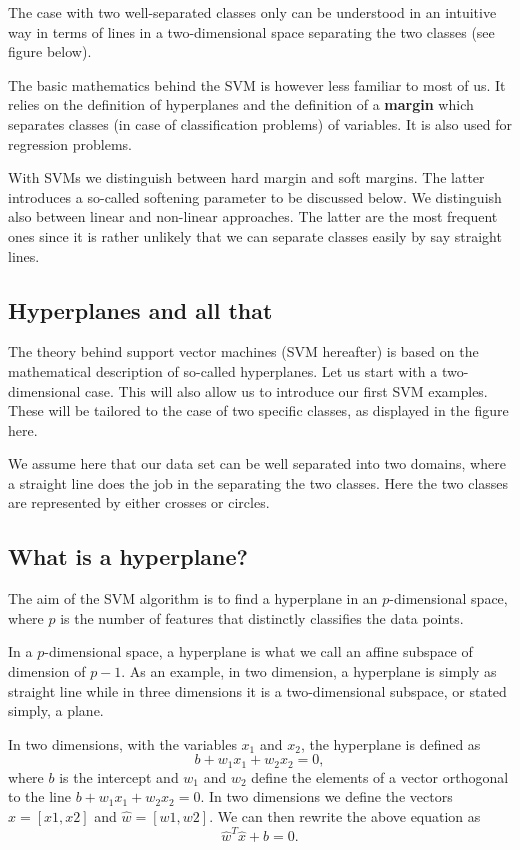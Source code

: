\documentclass[%
oneside,                 %
final,                   %
10pt]{article}
\begin{document}
The case with two well-separated classes only can be understood in an intuitive way in terms of lines in a two-dimensional space separating the two classes (see figure below).  

The basic mathematics behind the SVM is however less familiar to most of us. 
It relies on the definition of hyperplanes and the
definition of a \textbf{margin} which separates classes (in case of
classification problems) of variables. It is also used for regression
problems.

With SVMs we distinguish between hard margin and soft margins. The latter introduces a so-called softening parameter to be discussed below.
We distinguish also between linear and non-linear approaches. The latter are the most frequent ones since it is rather unlikely that we can separate classes easily by say straight lines. 




\subsection*{Hyperplanes and all that}

The theory behind support vector machines (SVM hereafter) is based on
the mathematical description of so-called hyperplanes. Let us start
with a two-dimensional case. This will also allow us to introduce our
first SVM examples. These will be tailored to the case of two specific
classes, as displayed in the figure here.

We assume here that our data set can be well separated into two
domains, where a straight line does the job in the separating the two
classes. Here the two classes are represented by either crosses or
circles.

\subsection*{What is a hyperplane?}

The aim of the SVM algorithm is to find a hyperplane in an $p$-dimensional space, where $p$ is the number of features  that distinctly classifies the data points.  

In a $p$-dimensional space, a hyperplane is what we call an affine subspace of dimension of $p-1$.
As an example, in two dimension, a hyperplane is simply as straight line while in three dimensions it is 
a two-dimensional subspace, or stated simply, a plane. 

In two dimensions, with the variables $x_1$ and $x_2$, the hyperplane is defined as
\[
b+w_1x_1+w_2x_2=0,
\]
where $b$ is the intercept and $w_1$ and $w_2$ define the elements of a vector orthogonal to the line 
$b+w_1x_1+w_2x_2=0$. 
In two dimensions we define the vectors $\hat{x} =[x1,x2]$ and $\hat{w}=[w1,w2]$. 
We can then rewrite the above equation as 
\[
\hat{w}^T\hat{x}+b=0.
\]
\end{document}
